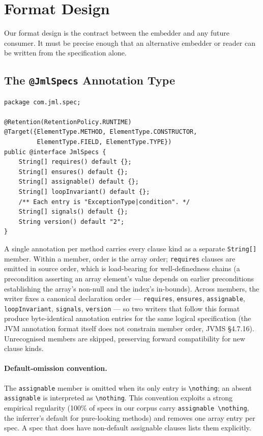 \section{Format Design}
\label{sec:format}

Our format design is the contract between the embedder and any future consumer. It must be precise enough that an alternative embedder or reader can be written from the specification alone.

\subsection{The \texttt{@JmlSpecs} Annotation Type}

\begin{lstlisting}
package com.jml.spec;

@Retention(RetentionPolicy.RUNTIME)
@Target({ElementType.METHOD, ElementType.CONSTRUCTOR,
         ElementType.FIELD, ElementType.TYPE})
public @interface JmlSpecs {
    String[] requires() default {};
    String[] ensures() default {};
    String[] assignable() default {};
    String[] loopInvariant() default {};
    /** Each entry is "ExceptionType|condition". */
    String[] signals() default {};
    String version() default "2";
}
\end{lstlisting}

A single annotation per method carries every clause kind as a separate \texttt{String[]} member. Within a member, order is the array order; \texttt{requires} clauses are emitted in source order, which is load-bearing for well-definedness chains (a precondition asserting an array element's value depends on earlier preconditions establishing the array's non-null and the index's in-bounds). Across members, the writer fixes a canonical declaration order --- \texttt{requires}, \texttt{ensures}, \texttt{assignable}, \texttt{loopInvariant}, \texttt{signals}, \texttt{version} --- so two writers that follow this format produce byte-identical annotation entries for the same logical specification (the JVM annotation format itself does not constrain member order, JVMS \S4.7.16). Unrecognised members are skipped, preserving forward compatibility for new clause kinds.

\paragraph{Default-omission convention.}
The \texttt{assignable} member is omitted when its only entry is \texttt{\textbackslash nothing}; an absent \texttt{assignable} is interpreted as \texttt{\textbackslash nothing}. This convention exploits a strong empirical regularity (100\% of specs in our corpus carry \texttt{assignable \textbackslash nothing}, the inferrer's default for pure-looking methods) and removes one array entry per spec. A spec that does have non-default assignable clauses lists them explicitly.

